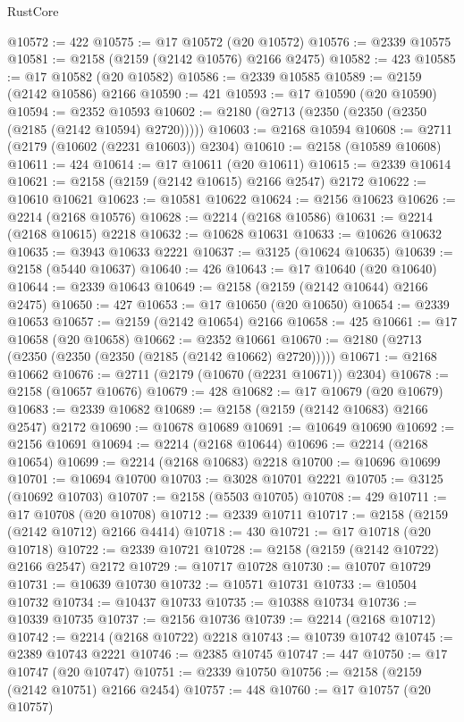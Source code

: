 \begin{lexlean}{RustCore}
\begin{coremodule}
@10572 := 422
@10575 := @17 @10572 (@20 @10572)
@10576 := @2339 @10575
@10581 := @2158 (@2159 (@2142 @10576) @2166 @2475)
@10582 := 423
@10585 := @17 @10582 (@20 @10582)
@10586 := @2339 @10585
@10589 := @2159 (@2142 @10586) @2166
@10590 := 421
@10593 := @17 @10590 (@20 @10590)
@10594 := @2352 @10593
@10602 := @2180 (@2713 (@2350 (@2350 (@2350 (@2185 (@2142 @10594) @2720)))))
@10603 := @2168 @10594
@10608 := @2711 (@2179 (@10602 (@2231 @10603)) @2304)
@10610 := @2158 (@10589 @10608)
@10611 := 424
@10614 := @17 @10611 (@20 @10611)
@10615 := @2339 @10614
@10621 := @2158 (@2159 (@2142 @10615) @2166 @2547) @2172
@10622 := @10610 @10621
@10623 := @10581 @10622
@10624 := @2156 @10623
@10626 := @2214 (@2168 @10576)
@10628 := @2214 (@2168 @10586)
@10631 := @2214 (@2168 @10615) @2218
@10632 := @10628 @10631
@10633 := @10626 @10632
@10635 := @3943 @10633 @2221
@10637 := @3125 (@10624 @10635)
@10639 := @2158 (@5440 @10637)
@10640 := 426
@10643 := @17 @10640 (@20 @10640)
@10644 := @2339 @10643
@10649 := @2158 (@2159 (@2142 @10644) @2166 @2475)
@10650 := 427
@10653 := @17 @10650 (@20 @10650)
@10654 := @2339 @10653
@10657 := @2159 (@2142 @10654) @2166
@10658 := 425
@10661 := @17 @10658 (@20 @10658)
@10662 := @2352 @10661
@10670 := @2180 (@2713 (@2350 (@2350 (@2350 (@2185 (@2142 @10662) @2720)))))
@10671 := @2168 @10662
@10676 := @2711 (@2179 (@10670 (@2231 @10671)) @2304)
@10678 := @2158 (@10657 @10676)
@10679 := 428
@10682 := @17 @10679 (@20 @10679)
@10683 := @2339 @10682
@10689 := @2158 (@2159 (@2142 @10683) @2166 @2547) @2172
@10690 := @10678 @10689
@10691 := @10649 @10690
@10692 := @2156 @10691
@10694 := @2214 (@2168 @10644)
@10696 := @2214 (@2168 @10654)
@10699 := @2214 (@2168 @10683) @2218
@10700 := @10696 @10699
@10701 := @10694 @10700
@10703 := @3028 @10701 @2221
@10705 := @3125 (@10692 @10703)
@10707 := @2158 (@5503 @10705)
@10708 := 429
@10711 := @17 @10708 (@20 @10708)
@10712 := @2339 @10711
@10717 := @2158 (@2159 (@2142 @10712) @2166 @4414)
@10718 := 430
@10721 := @17 @10718 (@20 @10718)
@10722 := @2339 @10721
@10728 := @2158 (@2159 (@2142 @10722) @2166 @2547) @2172
@10729 := @10717 @10728
@10730 := @10707 @10729
@10731 := @10639 @10730
@10732 := @10571 @10731
@10733 := @10504 @10732
@10734 := @10437 @10733
@10735 := @10388 @10734
@10736 := @10339 @10735
@10737 := @2156 @10736
@10739 := @2214 (@2168 @10712)
@10742 := @2214 (@2168 @10722) @2218
@10743 := @10739 @10742
@10745 := @2389 @10743 @2221
@10746 := @2385 @10745
@10747 := 447
@10750 := @17 @10747 (@20 @10747)
@10751 := @2339 @10750
@10756 := @2158 (@2159 (@2142 @10751) @2166 @2454)
@10757 := 448
@10760 := @17 @10757 (@20 @10757)

\end{coremodule}
\end{lexlean}
